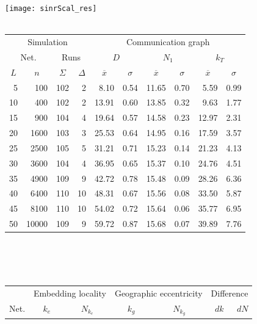 \documentclass{article}
\begin{document}
\begin{figure}[h]
\begin{center}
\texttt{[image: sinrScal\_res]}
~\\~\\
\begin{tabular}{|rr|rr|rr|rr|rr|}
\hline
\multicolumn{4}{|c|}{Simulation} & \multicolumn{6}{|c|}{Communication graph}\\
\multicolumn{2}{|c}{Net.} & \multicolumn{2}{c|}{Runs} & \multicolumn{2}{|c}{$D$} & \multicolumn{2}{c}{$N_1$} & \multicolumn{2}{c|}{$k_T$}\\
\hline
\multicolumn{1}{|c}{$L$} & \multicolumn{1}{c|}{$n$} & \multicolumn{1}{|c}{$\Sigma$} & \multicolumn{1}{c|}{$\Delta$} & \multicolumn{1}{|c}{$\overline{x}$} & \multicolumn{1}{c|}{$\sigma$} & \multicolumn{1}{|c}{$\overline{x}$} & \multicolumn{1}{c|}{$\sigma$} & \multicolumn{1}{|c}{$\overline{x}$} & \multicolumn{1}{c|}{$\sigma$}\\
5  &   100 & 102 &  2 &  8.10 & 0.54 & 11.65 & 0.70 &  5.59 & 0.99\\
10 &   400 & 102 &  2 & 13.91 & 0.60 & 13.85 & 0.32 &  9.63 & 1.77\\
15 &   900 & 104 &  4 & 19.64 & 0.57 & 14.58 & 0.23 & 12.97 & 2.31\\
20 &  1600 & 103 &  3 & 25.53 & 0.64 & 14.95 & 0.16 & 17.59 & 3.57\\
25 &  2500 & 105 &  5 & 31.21 & 0.71 & 15.23 & 0.14 & 21.23 & 4.13\\
30 &  3600 & 104 &  4 & 36.95 & 0.65 & 15.37 & 0.10 & 24.76 & 4.51\\
35 &  4900 & 109 &  9 & 42.72 & 0.78 & 15.48 & 0.09 & 28.26 & 6.36\\
40 &  6400 & 110 & 10 & 48.31 & 0.67 & 15.56 & 0.08 & 33.50 & 5.87\\
45 &  8100 & 110 & 10 & 54.02 & 0.72 & 15.64 & 0.06 & 35.77 & 6.95\\
50 & 10000 & 109 &  9 & 59.72 & 0.87 & 15.68 & 0.07 & 39.89 & 7.76\\
\hline
\end{tabular}\\
~\\~\\
\begin{tabular}{|r|rr|rr|rr|rr|rr|}
\hline
& \multicolumn{4}{|c|}{Embedding locality} & \multicolumn{4}{|c|}{Geographic eccentricity} & \multicolumn{2}{|c|}{Difference}\\
Net. & \multicolumn{2}{c}{$k_e$} & \multicolumn{2}{c|}{$N_{k_e}$} & \multicolumn{2}{c}{$k_g$} & \multicolumn{2}{c|}{$N_{k_g}$}& $dk$ & $dN$\\

\end{tabular}
\end{center}
\end{figure}
\end{document}

